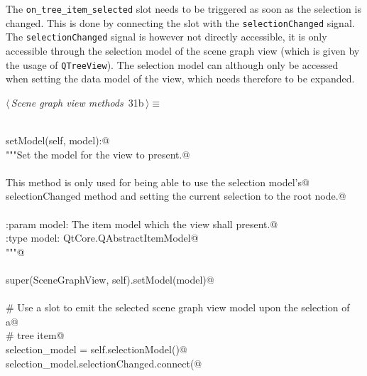 \documentclass[
    a4paper,      %
    10pt,         %
    openright,    %
    notitlepage,  %
    parskip=half, %
]{scrreprt}       %
\theoremstyle{definition}                    %
\begin{document}
The \verb+on_tree_item_selected+ slot needs to be triggered as soon as the
selection is changed. This is done by connecting the slot with the
\verb+selectionChanged+ signal. The \verb+selectionChanged+ signal is however
not directly accessible, it is only accessible through the selection model of
the scene graph view (which is given by the usage of \verb+QTreeView+). The
selection model can although only be accessed when setting the data model of the
view, which needs therefore to be expanded.

\begin{flushleft} \small
\begin{minipage}{\linewidth}\label{scrap35}\raggedright\small
{} $\langle\,${\itshape Scene graph view methods}\nobreak\ {\footnotesize {31b}}$\,\rangle\equiv$
\vspace{-1ex}
\begin{list}{}{} \item
\mbox{}\lstinline@@\\
\mbox{}\lstinline@def setModel(self, model):@\\
\mbox{}\lstinline@    """Set the model for the view to present.@\\
\mbox{}\lstinline@@\\
\mbox{}\lstinline@    This method is only used for being able to use the selection model's@\\
\mbox{}\lstinline@    selectionChanged method and setting the current selection to the root node.@\\
\mbox{}\lstinline@@\\
\mbox{}\lstinline@    :param model: The item model which the view shall present.@\\
\mbox{}\lstinline@    :type  model: QtCore.QAbstractItemModel@\\
\mbox{}\lstinline@    """@\\
\mbox{}\lstinline@@\\
\mbox{}\lstinline@    super(SceneGraphView, self).setModel(model)@\\
\mbox{}\lstinline@@\\
\mbox{}\lstinline@    # Use a slot to emit the selected scene graph view model upon the selection of a@\\
\mbox{}\lstinline@    # tree item@\\
\mbox{}\lstinline@    selection_model = self.selectionModel()@\\
\mbox{}\lstinline@    selection_model.selectionChanged.connect(@\\

\end{list}
\end{minipage}
\end{flushleft}
\end{document}
